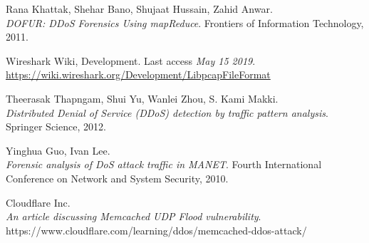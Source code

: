 \newpage
\begin{thebibliography}{9}
Rana Khattak, Shehar Bano, Shujaat Hussain, Zahid Anwar. 
\\\textit{DOFUR: DDoS Forensics Using mapReduce}. Frontiers of Information Technology, 2011.

Wireshark Wiki, Development. Last access \textit{May 15 2019}.
\\\url{https://wiki.wireshark.org/Development/LibpcapFileFormat}

Theerasak Thapngam, Shui Yu, Wanlei Zhou, S. Kami Makki.
\\\textit{Distributed Denial of Service (DDoS) detection by traffic pattern analysis}.
Springer Science, 2012.

Yinghua Guo, Ivan Lee.
\\\textit{Forensic analysis of DoS attack traffic in MANET}. 
Fourth International Conference on Network and System Security, 2010.

Cloudflare Inc.
\\\textit{An article discussing Memcached UDP Flood vulnerability}. 
https://www.cloudflare.com/learning/ddos/memcached-ddos-attack/

\end{thebibliography}